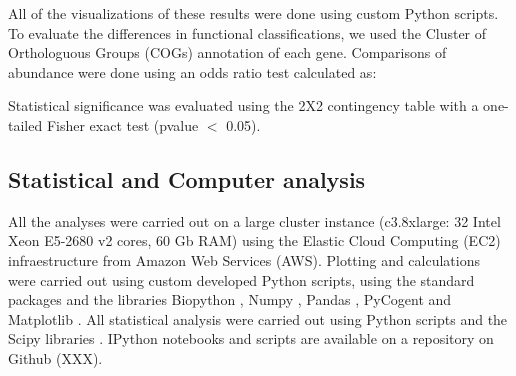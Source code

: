 All of the visualizations of these results were done using custom Python scripts. To evaluate the differences in functional classifications, we used the Cluster of Orthologuous Groups (COGs) \cite{Tatusov:2003fk} annotation of each gene. Comparisons of abundance were done using an odds ratio test calculated as:

\begin{center}
\end{center}

Statistical significance was evaluated using the 2X2 contingency table with a one-tailed Fisher exact test (pvalue $<$ 0.05).


\subsection{Statistical and Computer analysis}

All the analyses were carried out on a large cluster instance (c3.8xlarge: 32 Intel Xeon E5-2680 v2 cores, 60 Gb RAM) using the Elastic Cloud Computing (EC2) infraestructure from Amazon Web Services (AWS). Plotting and calculations were carried out using custom developed Python scripts, using the standard packages and the libraries Biopython \cite{Cock:2009hj}, Numpy \cite{Oliphant:2007ud} , Pandas \cite{mckinney-proc-scipy-2010}, PyCogent \cite{Knight:2007gp} and Matplotlib \cite{Hunter:2007ih}. All statistical analysis were carried out using Python scripts and the Scipy libraries \cite{Oliphant:2007ud}. IPython notebooks \cite{Perez:2007wf} and scripts are available on a repository on Github (XXX).



